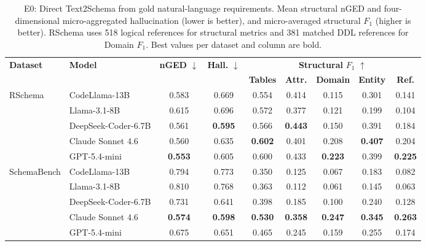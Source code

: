 \begin{table}[t]
\centering
\small
\setlength{\tabcolsep}{3pt}
\renewcommand{\arraystretch}{1.0}
\caption{E0: Direct Text2Schema from gold natural-language
requirements. Mean structural nGED and four-dimensional
micro-aggregated hallucination (lower is better), and
micro-averaged structural $F_1$ (higher is better).
RSchema uses 518 logical references for structural metrics
and 381 matched DDL references for Domain $F_1$.
Best values per dataset and column are bold.}
\label{tab:e0_overall}

\begin{tabular*}{\textwidth}
{@{\extracolsep{\fill}}llccccccc@{}}
\toprule
\multirow{2}{*}{\textbf{Dataset}}
& \multirow{2}{*}{\textbf{Model}}
& \multirow{2}{*}{\textbf{nGED} $\downarrow$}
& \multirow{2}{*}{\textbf{Hall.} $\downarrow$}
& \multicolumn{5}{c}{\textbf{Structural} $F_1$ $\uparrow$} \\
\cmidrule(lr){5-9}
& & & &
\textbf{Tables} & \textbf{Attr.}
& \textbf{Domain} & \textbf{Entity}
& \textbf{Ref.} \\
\midrule

RSchema & CodeLlama-13B & 0.583 & 0.669 & 0.554 & 0.414 & 0.115 & 0.301 & 0.141 \\
 & Llama-3.1-8B & 0.615 & 0.696 & 0.572 & 0.377 & 0.121 & 0.199 & 0.104 \\
 & DeepSeek-Coder-6.7B & 0.561 & \textbf{0.595} & 0.566 & \textbf{0.443} & 0.150 & 0.391 & 0.184 \\
 & Claude Sonnet 4.6 & 0.560 & 0.635 & \textbf{0.602} & 0.401 & 0.208 & \textbf{0.407} & 0.204 \\
 & GPT-5.4-mini & \textbf{0.553} & 0.605 & 0.600 & 0.433 & \textbf{0.223} & 0.399 & \textbf{0.225} \\

\midrule

SchemaBench & CodeLlama-13B & 0.794 & 0.773 & 0.350 & 0.125 & 0.067 & 0.183 & 0.082 \\
 & Llama-3.1-8B & 0.810 & 0.768 & 0.363 & 0.112 & 0.061 & 0.145 & 0.063 \\
 & DeepSeek-Coder-6.7B & 0.731 & 0.641 & 0.398 & 0.185 & 0.100 & 0.240 & 0.128 \\
 & Claude Sonnet 4.6 & \textbf{0.574} & \textbf{0.598} & \textbf{0.530} & \textbf{0.358} & \textbf{0.247} & \textbf{0.345} & \textbf{0.263} \\
 & GPT-5.4-mini & 0.675 & 0.651 & 0.465 & 0.245 & 0.159 & 0.255 & 0.174 \\

\bottomrule
\end{tabular*}
\end{table}
